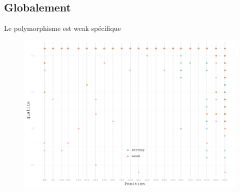 \documentclass[xcolor=dvipsnames]{beamer}
\begin{document}
\subsection{Globalement}
\label{subsec:globaemnet}

\begin{frame}{Le polymorphisme est weak spécifique}
 \begin{figure}[htbp]
   \centering
   \includegraphics[width=0.8\linewidth]{../qualite_distrib.pdf}
 \end{figure}
 
\end{frame}
\end{document}
